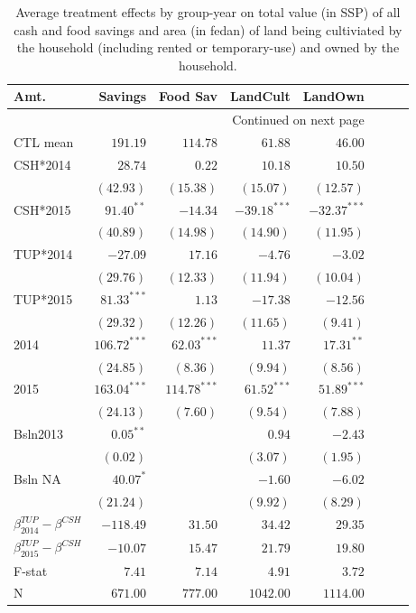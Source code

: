 \documentclass[12pt,article]{article}
\begin{document}
\begin{longtable}{lrrrrrrr}
\caption{\label{tab:Savings}Average treatment effects by group-year on total value (in SSP) of all cash and food savings and area (in fedan) of land being cultiviated by the household (including rented or temporary-use) and owned by the household.}
\\
\hline
Amt. & Savings & Food Sav & LandCult & LandOwn\\
\hline
\endhead
\hline\multicolumn{5}{r}{Continued on next page} \\
\endfoot
\endlastfoot
CTL mean & $191.19$ & $114.78$ & $61.88$ & $46.00$\\
\hline
CSH*2014 & $28.74$ & $0.22$ & $10.18$ & $10.50$\\
 & $(42.93)$ & $(15.38)$ & $(15.07)$ & $(12.57)$\\
CSH*2015 & $91.40^{**}$ & $-14.34$ & $-39.18^{***}$ & $-32.37^{***}$\\
 & $(40.89)$ & $(14.98)$ & $(14.90)$ & $(11.95)$\\
TUP*2014 & $-27.09$ & $17.16$ & $-4.76$ & $-3.02$\\
 & $(29.76)$ & $(12.33)$ & $(11.94)$ & $(10.04)$\\
TUP*2015 & $81.33^{***}$ & $1.13$ & $-17.38$ & $-12.56$\\
 & $(29.32)$ & $(12.26)$ & $(11.65)$ & $( 9.41)$\\
2014 & $106.72^{***}$ & $62.03^{***}$ & $11.37$ & $17.31^{**}$\\
 & $(24.85)$ & $( 8.36)$ & $( 9.94)$ & $( 8.56)$\\
2015 & $163.04^{***}$ & $114.78^{***}$ & $61.52^{***}$ & $51.89^{***}$\\
 & $(24.13)$ & $( 7.60)$ & $( 9.54)$ & $( 7.88)$\\
Bsln2013 & $0.05^{**}$ &  & $0.94$ & $-2.43$\\
 & $( 0.02)$ &  & $( 3.07)$ & $( 1.95)$\\
Bsln NA & $40.07^{*}$ &  & $-1.60$ & $-6.02$\\
 & $(21.24)$ &  & $( 9.92)$ & $( 8.29)$\\
\hline
$\beta^{TUP}_{2014}-\beta^{CSH}$ & $-118.49$ & $31.50$ & $34.42$ & $29.35$\\
$\beta^{TUP}_{2015}-\beta^{CSH}$ & $-10.07$ & $15.47$ & $21.79$ & $19.80$\\
\hline
F-stat & $7.41$ & $7.14$ & $4.91$ & $3.72$\\
N & $671.00$ & $777.00$ & $1042.00$ & $1114.00$\\
\hline
\end{longtable}
\end{document}
